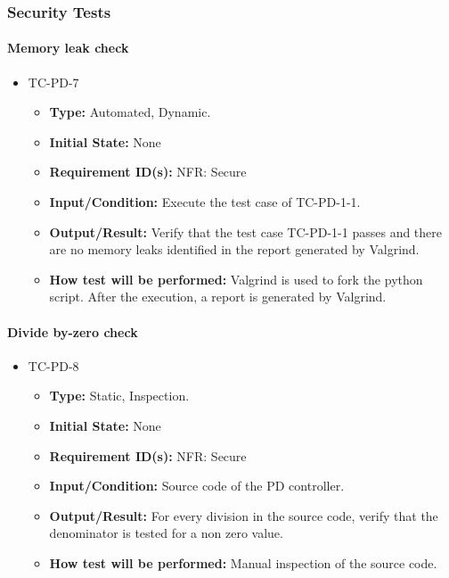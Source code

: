 \documentclass[12pt, titlepage]{article}
\begin{document}
\subsubsection{Security Tests}

\paragraph{Memory leak check}
\begin{itemize}
\item{TC-PD-7\\}
\begin{itemize}
\item{\textbf{Type:}} Automated, Dynamic.
					
\item{\textbf{Initial State:}} None

\item{\textbf{Requirement ID(s):}} NFR: Secure
					
\item{\textbf{Input/Condition:}}  Execute the test case of TC-PD-1-1.
					
\item{\textbf{Output/Result:}} Verify that the test case TC-PD-1-1 passes and there
are no memory leaks identified in the  report generated by Valgrind.

\item{\textbf{How test will be performed:}} Valgrind \cite{Valgrind} is used to fork
the python script. After the execution, a report is generated by Valgrind. 
\end{itemize}
\end{itemize}

\paragraph{Divide by-zero check}
\begin{itemize}
\item{TC-PD-8\\}
\begin{itemize}
\item{\textbf{Type:}} Static, Inspection.
					
\item{\textbf{Initial State:}} None

\item{\textbf{Requirement ID(s):}}  NFR: Secure
					
\item{\textbf{Input/Condition:}}  Source code of the PD controller.
					
\item{\textbf{Output/Result:}} For every division in the source code, verify that
the denominator is tested for a non zero value. 

\item{\textbf{How test will be performed:}}  Manual inspection of the source code.
\end{itemize}
\end{itemize}
\end{document}
